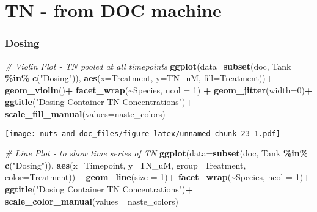 \documentclass[
]{article}
\newenvironment{Shaded}{\begin{snugshade}}{\end{snugshade}}
\newcommand{\AttributeTok}[1]{\textcolor[rgb]{0.13,0.29,0.53}{#1}}
\newcommand{\CommentTok}[1]{\textcolor[rgb]{0.56,0.35,0.01}{\textit{#1}}}
\newcommand{\DecValTok}[1]{\textcolor[rgb]{0.00,0.00,0.81}{#1}}
\newcommand{\FunctionTok}[1]{\textcolor[rgb]{0.13,0.29,0.53}{\textbf{#1}}}
\newcommand{\NormalTok}[1]{#1}
\newcommand{\SpecialCharTok}[1]{\textcolor[rgb]{0.81,0.36,0.00}{\textbf{#1}}}
\newcommand{\StringTok}[1]{\textcolor[rgb]{0.31,0.60,0.02}{#1}}
\begin{document}
\hypertarget{tn---from-doc-machine}{%
\section{TN - from DOC machine}\label{tn---from-doc-machine}}

\hypertarget{dosing-9}{%
\subsubsection{Dosing}\label{dosing-9}}

\begin{Shaded}
\begin{Highlighting}[]
\CommentTok{\# Violin Plot {-} TN pooled at all timepoints}
\FunctionTok{ggplot}\NormalTok{(}\AttributeTok{data=}\FunctionTok{subset}\NormalTok{(doc, Tank }\SpecialCharTok{\%in\%} \FunctionTok{c}\NormalTok{(}\StringTok{"Dosing"}\NormalTok{)), }\FunctionTok{aes}\NormalTok{(}\AttributeTok{x=}\NormalTok{Treatment, }\AttributeTok{y=}\NormalTok{TN\_uM, }\AttributeTok{fill=}\NormalTok{Treatment))}\SpecialCharTok{+}
  \FunctionTok{geom\_violin}\NormalTok{()}\SpecialCharTok{+}
  \FunctionTok{facet\_wrap}\NormalTok{(}\SpecialCharTok{\textasciitilde{}}\NormalTok{Species, }\AttributeTok{ncol =} \DecValTok{1}\NormalTok{) }\SpecialCharTok{+}
  \FunctionTok{geom\_jitter}\NormalTok{(}\AttributeTok{width=}\DecValTok{0}\NormalTok{)}\SpecialCharTok{+}
  \FunctionTok{ggtitle}\NormalTok{(}\StringTok{"Dosing Container TN Concentrations"}\NormalTok{)}\SpecialCharTok{+}
  \FunctionTok{scale\_fill\_manual}\NormalTok{(}\AttributeTok{values=}\NormalTok{naste\_colors)}
\end{Highlighting}
\end{Shaded}

\texttt{[image: nuts-and-doc\_files/figure-latex/unnamed-chunk-23-1.pdf]}

\begin{Shaded}
\begin{Highlighting}[]
\CommentTok{\# Line Plot {-} to show time series of TN}
\FunctionTok{ggplot}\NormalTok{(}\AttributeTok{data=}\FunctionTok{subset}\NormalTok{(doc, Tank }\SpecialCharTok{\%in\%} \FunctionTok{c}\NormalTok{(}\StringTok{"Dosing"}\NormalTok{)), }\FunctionTok{aes}\NormalTok{(}\AttributeTok{x=}\NormalTok{Timepoint, }\AttributeTok{y=}\NormalTok{TN\_uM, }\AttributeTok{group=}\NormalTok{Treatment, }\AttributeTok{color=}\NormalTok{Treatment))}\SpecialCharTok{+}
  \FunctionTok{geom\_line}\NormalTok{(}\AttributeTok{size =} \DecValTok{1}\NormalTok{)}\SpecialCharTok{+}
  \FunctionTok{facet\_wrap}\NormalTok{(}\SpecialCharTok{\textasciitilde{}}\NormalTok{Species, }\AttributeTok{ncol =} \DecValTok{1}\NormalTok{)}\SpecialCharTok{+}
  \FunctionTok{ggtitle}\NormalTok{(}\StringTok{"Dosing Container TN Concentrations"}\NormalTok{)}\SpecialCharTok{+}
  \FunctionTok{scale\_color\_manual}\NormalTok{(}\AttributeTok{values=}\NormalTok{ naste\_colors)}
\end{Highlighting}
\end{Shaded}
\end{document}
